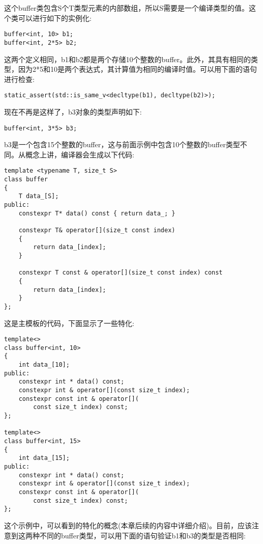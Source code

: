 这个buffer类包含S个T类型元素的内部数组，所以S需要是一个编译类型的值。这个类可以进行如下的实例化:

\begin{lstlisting}[style=styleCXX]
buffer<int, 10> b1;
buffer<int, 2*5> b2;
\end{lstlisting}

这两个定义相同，b1和b2都是两个存储10个整数的buffer。此外，其具有相同的类型，因为2*5和10是两个表达式，其计算值为相同的编译时值。可以用下面的语句进行检查:

\begin{lstlisting}[style=styleCXX]
static_assert(std::is_same_v<decltype(b1), decltype(b2)>);
\end{lstlisting}

现在不再是这样了，b3对象的类型声明如下:

\begin{lstlisting}[style=styleCXX]
buffer<int, 3*5> b3;
\end{lstlisting}

b3是一个包含15个整数的buffer，这与前面示例中包含10个整数的buffer类型不同。从概念上讲，编译器会生成以下代码:

\begin{lstlisting}[style=styleCXX]
template <typename T, size_t S>
class buffer
{
	T data_[S];
public:
	constexpr T* data() const { return data_; }
	
	constexpr T& operator[](size_t const index)
	{
		return data_[index];
	}

	constexpr T const & operator[](size_t const index) const
	{
		return data_[index];
	}
};
\end{lstlisting}

这是主模板的代码，下面显示了一些特化:

\begin{lstlisting}[style=styleCXX]
template<>
class buffer<int, 10>
{
	int data_[10];
public:
	constexpr int * data() const;
	constexpr int & operator[](const size_t index);
	constexpr const int & operator[](
		const size_t index) const;
};

template<>
class buffer<int, 15>
{
	int data_[15];
public:
	constexpr int * data() const;
	constexpr int & operator[](const size_t index);
	constexpr const int & operator[](
		const size_t index) const;
};
\end{lstlisting}

这个示例中，可以看到的特化的概念(本章后续的内容中详细介绍)。目前，应该注意到这两种不同的buffer类型，可以用下面的语句验证b1和b3的类型是否相同:

